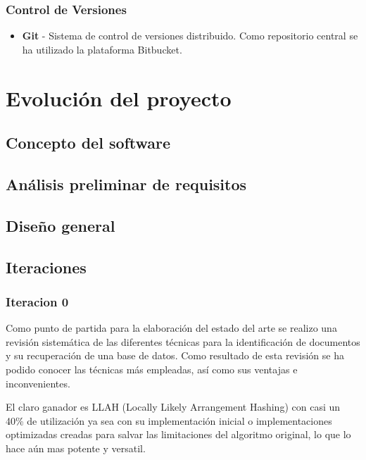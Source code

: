 \subsubsection{Control de Versiones}
\begin{itemize}
\item \textbf{Git} - Sistema de control de versiones distribuido. Como repositorio central se ha utilizado la plataforma Bitbucket.
\end{itemize}

\section{Evolución del proyecto}
\subsection{Concepto del software}
\subsection{Análisis preliminar de requisitos}
\subsection{Diseño general}
\subsection{Iteraciones}

\subsubsection{Iteracion 0}
Como punto de partida para la elaboración del estado del arte se realizo una revisión sistemática de las diferentes técnicas para la identificación de documentos y su recuperación de una base de datos. Como resultado de esta revisión se ha podido conocer las técnicas más empleadas, así como sus ventajas e inconvenientes. 

El claro ganador es LLAH (Locally Likely Arrangement Hashing) con casi un 40\% de utilización ya sea con su implementación inicial o implementaciones optimizadas creadas para salvar las limitaciones del algoritmo original, lo que lo hace aún mas potente y versatil.

